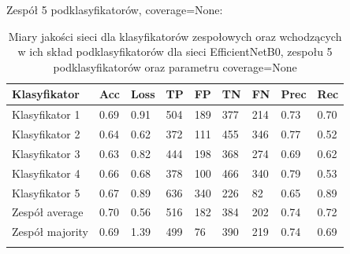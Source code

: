 \documentclass[polish,12pt]{aghthesis}
\begin{document}
\vspace{3mm}
\noindent Zespół 5 podklasyfikatorów, coverage=None:
\renewcommand{\arraystretch}{1.75}
 \begin{longtable}[h!]{|m{2.6cm}|m{1.2cm}|m{1.2cm}|m{1.2cm}|m{1.2cm}|m{1.2cm}|m{1.2cm}|m{1.2cm}|m{1.2cm}|}
 \hline
 Klasyfikator & Acc & Loss & TP & FP & TN & FN & Prec & Rec\\
 \hline
 Klasyfikator 1 & 0.69 & 0.91 & 504 & 189 & 377 & 214 & 0.73 & 0.70\\
 \hline
 Klasyfikator 2 & 0.64 & 0.62 & 372 & 111 & 455 & 346 & 0.77 & 0.52\\
 \hline
 Klasyfikator 3 & 0.63 & 0.82 & 444 & 198 & 368 & 274 & 0.69 & 0.62\\
 \hline
 Klasyfikator 4 & 0.66 & 0.68 & 378 & 100 & 466 & 340 & 0.79 & 0.53\\
 \hline
 Klasyfikator 5 & 0.67 & 0.89 & 636 & 340 & 226 & 82 & 0.65 & 0.89\\
 \hline
 Zespół average & 0.70 & 0.56 & 516 & 182 & 384 & 202 & 0.74 & 0.72\\ 
 \hline
 Zespół \newline majority & 0.69 & 1.39 & 499 & 76 & 390 & 219 & 0.74 & 0.69\\
 \hline
\caption{Miary jakości sieci dla klasyfikatorów zespołowych oraz wchodzących w ich skład podklasyfikatorów dla sieci EfficientNetB0, zespołu 5 podklasyfikatorów oraz parametru coverage=None}
\label{table:32}
\end{longtable}
\end{document}

